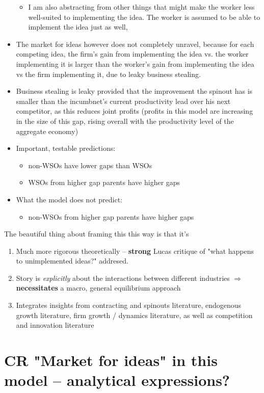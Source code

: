 \documentclass[12pt,english]{article}
\theoremstyle{remark}
\begin{document}
\begin{itemize}
\begin{itemize}
		\item I am also abstracting from other things that might make the worker less well-suited to implementing the idea. The worker is assumed to be able to implement the idea just as well, 
	\end{itemize}
	\item The market for ideas however does not completely unravel, because for each competing idea, the firm's gain from implementing the idea vs. the worker implementing it is larger than the worker's gain from implementing the idea vs the firm implementing it, due to leaky business stealing.
	\item Business stealing is leaky provided that the improvement the spinout has is smaller than the incumbnet's current productivity lead over his next competitor, as this reduces joint profits (profits in this model are increasing in the size of this gap, rising overall with the productivity level of the aggregate economy)
	\item Important, testable predictions:
	\begin{itemize}
		\item non-WSOs have lower gaps than WSOs
		\item WSOs from higher gap parents have higher gaps 
	\end{itemize}
	\item What the model does not predict:
	\begin{itemize}
		\item non-WSOs from higher gap parents have higher gaps
	\end{itemize}
\end{itemize}

The beautiful thing about framing this this way is that it's 
\begin{enumerate}
	\item Much more rigorous theoretically -- \textbf{strong} Lucas critique of "what happens to unimplemented ideas?" addresed.
	\item Story is \textit{explicitly} about the interactions between different industries $\Rightarrow$ \textbf{necessitates} a macro, general equilibrium approach
	\item Integrates insights from contracting and spinouts literature, endogenous growth literature, firm growth / dynamics literature, as well as competition and innovation literature
\end{enumerate}


\section{CR "Market for ideas" in this model -- analytical expressions?}
\end{document}
